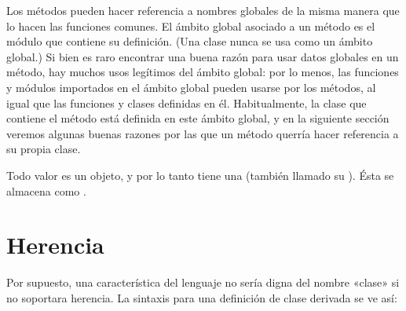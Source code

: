 \documentclass[a4,10pt,spanish]{sphinxmanual}
\begin{document}
\begin{sphinxVerbatim}[commandchars=\\\{\}]
 
     
          \PYG{p}{[}\PYG{p}{]}

      

      
\end{sphinxVerbatim}

\sphinxAtStartPar
Los métodos pueden hacer referencia a nombres globales de la misma manera que lo hacen las funciones comunes.  El ámbito global asociado a un método es el módulo que contiene su definición.  (Una clase nunca se usa como un ámbito global.)  Si bien es raro encontrar una buena razón para usar datos globales en un método, hay muchos usos legítimos del ámbito global: por lo menos, las funciones y módulos importados en el ámbito global pueden usarse por los métodos, al igual que las funciones y clases definidas en él. Habitualmente, la clase que contiene el método está definida en este ámbito global, y en la siguiente sección veremos algunas buenas razones por las que un método querría hacer referencia a su propia clase.

\sphinxAtStartPar
Todo valor es un objeto, y por lo tanto tiene una  (también llamado su ). Ésta se almacena como .


\section{Herencia}
\label{\detokenize{tutorial/classes:inheritance}}\label{\detokenize{tutorial/classes:tut-inheritance}}
\sphinxAtStartPar
Por supuesto, una característica del lenguaje no sería digna del nombre «clase» si no soportara herencia.  La sintaxis para una definición de clase derivada se ve así:

\begin{sphinxVerbatim}[commandchars=\\\{\}]
 
\end{sphinxVerbatim}
\end{document}
